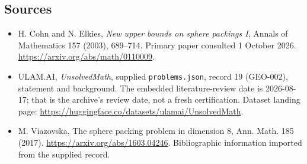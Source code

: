 \documentclass[11pt,a4paper]{article}
\begin{document}
\subsection{Sources}

{\small

\begin{itemize}
\item[E1] H. Cohn and N. Elkies, \emph{New upper bounds on sphere packings I}, Annals of Mathematics 157 (2003), 689--714. Primary paper consulted 1 October 2026. \url{https://arxiv.org/abs/math/0110009}.


\item[\hypertarget{source:19:1}{S1}] ULAM.AI, \emph{UnsolvedMath}, supplied \texttt{problems.json}, record 19 (GEO-002), statement and background. The embedded literature-review date is 2026-08-17; that is the archive’s review date, not a fresh certification. Dataset landing page: \url{https://huggingface.co/datasets/ulamai/UnsolvedMath}.

\item[\hypertarget{source:19:2}{S2}] M. Viazovska, The sphere packing problem in dimension 8, Ann. Math. 185 (2017). \url{https://arxiv.org/abs/1603.04246}. Bibliographic information imported from the supplied record.

\end{itemize}

}

\label{end:19}
\end{document}
